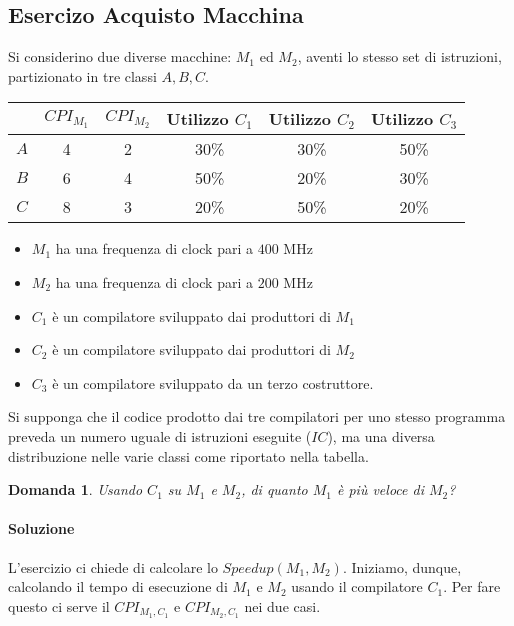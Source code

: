 \documentclass{article}
\newtheorem{domanda}{Domanda}[section]
\begin{document}
\subsection{Esercizo Acquisto Macchina}
Si considerino due diverse macchine: $M_1$ ed $M_2$, aventi lo stesso set di istruzioni, partizionato in tre classi $A,B,C$.
    
    
\begin{table}[h!]
\begin{tabular}{c|c|c|c|c|c|}
\cline{2-6}
                          & $CPI_{M_1}$ & $CPI_{M_2}$ & Utilizzo $C_1$ & Utilizzo $C_2$ & Utilizzo $C_3$ \\ \hline
\multicolumn{1}{|c|}{$A$} & 4           & 2           & 30\%           & 30\%           & 50\%           \\ \hline
\multicolumn{1}{|c|}{$B$} & 6           & 4           & 50\%           & 20\%           & 30\%           \\ \hline
\multicolumn{1}{|c|}{$C$} & 8           & 3           & 20\%           & 50\%           & 20\%           \\ \hline
\end{tabular}
\end{table}
    
    \begin{itemize}
        \item $M_1$ ha una frequenza di clock pari a $400$ MHz
        \item $M_2$ ha una frequenza di clock pari a $200$ MHz
        \item $C_1$ è un compilatore sviluppato dai produttori di $M_1$
        \item $C_2$ è un compilatore sviluppato dai produttori di $M_2$
        \item $C_3$ è un compilatore sviluppato da un terzo costruttore.
    \end{itemize}
    
    Si supponga che il codice prodotto dai tre compilatori per uno stesso programma preveda un numero uguale  di istruzioni eseguite ($IC$), ma una diversa distribuzione nelle varie classi come riportato nella tabella.
    
    \begin{domanda}
    Usando $C_1$ su $M_1$ e $M_2$, di quanto $M_1$ è più veloce di $M_2$?
    \end{domanda}
    \paragraph{Soluzione}
    L'esercizio ci chiede di calcolare lo $Speedup(M_1, M_2)$. Iniziamo, dunque, calcolando il tempo di esecuzione di $M_1$ e $M_2$ usando il compilatore $C_1$. Per fare questo ci serve il $CPI_{M_1, C_1}$ e $CPI_{M_2, C_1}$ nei due casi.
    
\end{document}
